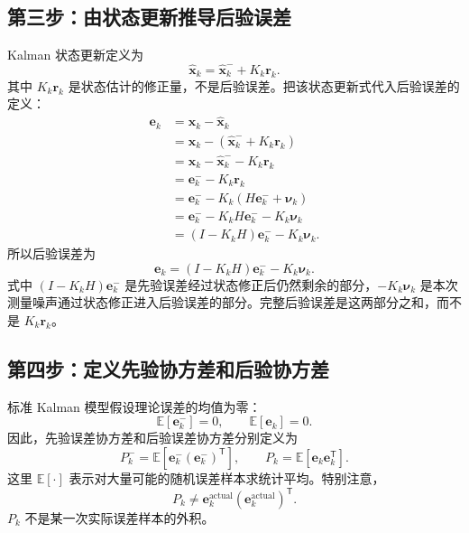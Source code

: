 \documentclass[UTF8,a4paper,11pt]{ctexart}
\newcommand{\prior}{^{-}}
\newcommand{\transpose}{^{\mathsf T}}
\begin{document}
\subsection*{第三步：由状态更新推导后验误差}

Kalman 状态更新定义为
\begin{equation}
\hat{\bm x}_k=\hat{\bm x}_k\prior+K_k\bm r_k.
\end{equation}
其中 $K_k\bm r_k$ 是状态估计的修正量，不是后验误差。把该状态更新式代入后验误差的定义：
\begin{align}
\bm e_k
&=\bm x_k-\hat{\bm x}_k\\
&=\bm x_k-(\hat{\bm x}_k\prior+K_k\bm r_k)\\
&=\bm x_k-\hat{\bm x}_k\prior-K_k\bm r_k\\
&=\bm e_k\prior-K_k\bm r_k\\
&=\bm e_k\prior-K_k(H\bm e_k\prior+\bm\nu_k)\\
&=\bm e_k\prior-K_kH\bm e_k\prior-K_k\bm\nu_k\\
&=(I-K_kH)\bm e_k\prior-K_k\bm\nu_k.
\end{align}
所以后验误差为
\begin{equation}
\boxed{\bm e_k=(I-K_kH)\bm e_k\prior-K_k\bm\nu_k}.
\end{equation}
式中 $(I-K_kH)\bm e_k\prior$ 是先验误差经过状态修正后仍然剩余的部分，$-K_k\bm\nu_k$ 是本次测量噪声通过状态修正进入后验误差的部分。完整后验误差是这两部分之和，而不是 $K_k\bm r_k$。

\subsection*{第四步：定义先验协方差和后验协方差}

标准 Kalman 模型假设理论误差的均值为零：
\begin{equation}
\mathbb E[\bm e_k\prior]=0,
\qquad
\mathbb E[\bm e_k]=0.
\end{equation}
因此，先验误差协方差和后验误差协方差分别定义为
\begin{equation}
P_k\prior
=\mathbb E[\bm e_k\prior(\bm e_k\prior)\transpose],
\qquad
P_k
=\mathbb E[\bm e_k\bm e_k\transpose].
\end{equation}
这里 $\mathbb E[\cdot]$ 表示对大量可能的随机误差样本求统计平均。特别注意，
\begin{equation}
P_k
\neq
\bm e_k^{\mathrm{actual}}
(\bm e_k^{\mathrm{actual}})\transpose.
\end{equation}
$P_k$ 不是某一次实际误差样本的外积。
\end{document}
